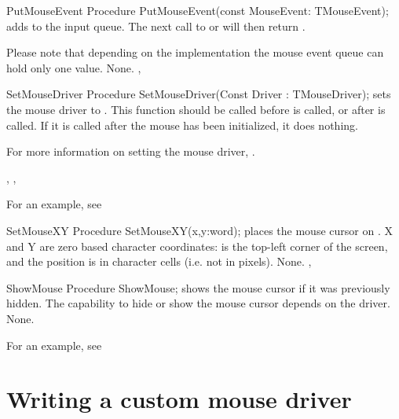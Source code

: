 \begin{procedure}{PutMouseEvent}
\Declaration
Procedure PutMouseEvent(const MouseEvent: TMouseEvent);
\Description
{} adds  to the input queue. The next
call to  or  will then return
. 

Please note that depending on the implementation the mouse event queue
can hold only one value.
\Errors
None.
\SeeAlso
{}, 
\end{procedure}

\begin{procedure}{SetMouseDriver}
\Declaration
Procedure SetMouseDriver(Const Driver : TMouseDriver);
\Description
{} sets the mouse driver to . This function
should be called before  is called, or after 
is called. If it is called after the mouse has been initialized, it does
nothing.

For more information on setting the mouse driver, .
\Errors

\SeeAlso
{}, , 
\end{procedure}

For an example, see 

\begin{procedure}{SetMouseXY}
\Declaration
Procedure SetMouseXY(x,y:word); 
\Description
{} places the mouse cursor on . X and Y are zero
based character coordinates:  is the top-left corner of the screen,
and the position is in character cells (i.e. not in pixels).
\Errors
None.
\SeeAlso
{}, 
\end{procedure}


\begin{procedure}{ShowMouse}
\Declaration
Procedure ShowMouse; 
\Description
{} shows the mouse cursor if it was previously hidden. The
capability to hide or show the mouse cursor depends on the driver.
\Errors
None.
\SeeAlso
{}
\end{procedure}

For an example, see 

\section{Writing a custom mouse driver}
\label{se:mousedrv}
